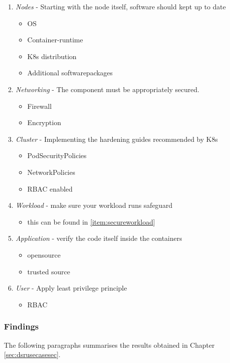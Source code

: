 \documentclass[MIC,Master,english]{twbook}%
\begin{document}
\begin{enumerate}
    \item \textit{Nodes} - Starting with the node itself, software should kept up to date
    \begin{itemize}
        \item \ac{OS}
        \item Container-runtime
        \item \ac{K8s} distribution
        \item Additional softwarepackages
    \end{itemize}
    \item \textit{Networking} - The component must be appropriately secured.
    \begin{itemize}
        \item Firewall
        \item Encryption
    \end{itemize}
    \item \textit{Cluster} - Implementing the hardening guides recommended by \ac{K8s}
    \begin{itemize}
        \item PodSecurityPolicies
        \item NetworkPolicies
        \item \ac{RBAC} enabled
    \end{itemize}
    \item \textit{Workload} - make sure your workload runs safeguard
    \begin{itemize}
        \item this can be found in \autoref{item:secureworkload}
    \end{itemize}
    \item \textit{Application} - verify the code itself inside the containers
    \begin{itemize}
        \item opensource
        \item trusted source
    \end{itemize}
    \item \textit{User} - Apply least privilege principle
    \begin{itemize}
        \item \ac{RBAC}
    \end{itemize}
\end{enumerate}

\subsubsection{Findings} The following paragraphs summarises the results obtained in Chapter \autoref{sec:dsrusecasesec}.
\end{document}
